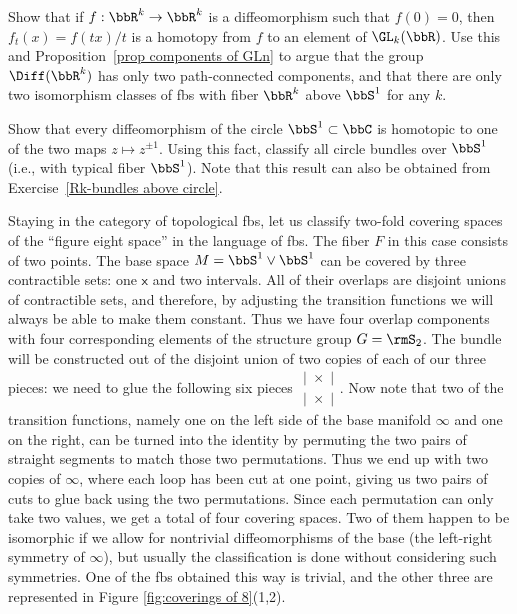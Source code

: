 \begin{xca}\label{Rk-bundles above circle}
    Show that if $f:\bbR^k\to \bbR^k$ is a diffeomorphism such that $f(0)=0$, then $f_t(x)=f(tx)/t$ is a homotopy from $f$ to an element of $\GL_k(\bbR)$. Use this and Proposition~\ref{prop components of GLn} to argue that the group $\Diff(\bbR^k)$ has only two path-connected components, and that there are only two isomorphism classes of \glspl{fb} with fiber $\bbR^k$  above $\bbS^1$ for any $k$.
\end{xca}
\begin{xca}
    Show that every diffeomorphism of the circle $\bbS^1\subset \bbC$ is homotopic to one of the two maps $z\mapsto z^{\pm 1}$. Using this fact, classify all circle bundles over $\bbS^1$ (i.e., with typical fiber $\bbS^1$). Note that this result can also be obtained from Exercise~\ref{Rk-bundles above circle}.
\end{xca}

\begin{example}
    Staying in the category of topological \glspl{fb}, let us classify two-fold covering spaces of the ``figure eight space'' in the language of \glspl{fb}. The fiber $F$ in this case consists of two points. The base space $M=\bbS^1\vee \bbS^1$ can be covered by three contractible sets: one $\mathsf{x}$ and two intervals. All of their overlaps are disjoint unions of contractible sets, and therefore, by adjusting the transition functions we will always be able to make them constant. Thus we have four overlap components with four corresponding elements of the structure group $G=\rmS_2$. The bundle will be constructed out of the disjoint union of two copies of each of our three pieces: we need to glue the following six pieces $\begin{matrix}
        |\; \times \;|\\
        |\; \times \;|
    \end{matrix}$. Now note that two of the transition functions, namely one on the left side of the base manifold $\infty$ and one on the right, can be turned into the identity by permuting the two pairs of straight segments to match those two permutations. Thus we end up with two copies of $\infty$, where each loop has been cut at one point, giving us two pairs of cuts to glue back using the two permutations. Since each permutation can only take two values, we get a total of four covering spaces. Two of them happen to be isomorphic if we allow for nontrivial diffeomorphisms of the base (the left-right symmetry of $\infty$), but usually the classification is done without considering such symmetries. One of the \glspl{fb} obtained this way is trivial, and the other three are represented in Figure \ref{fig:coverings of 8}(1,2).
\end{example}

